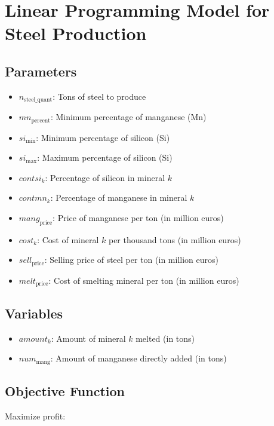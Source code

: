 \documentclass{article}
\begin{document}
\section*{Linear Programming Model for Steel Production}

\subsection*{Parameters}

\begin{itemize}
    \item $n_{\text{steel\_quant}}$: Tons of steel to produce
    \item $mn_{\text{percent}}$: Minimum percentage of manganese (Mn)
    \item $si_{\text{min}}$: Minimum percentage of silicon (Si)
    \item $si_{\text{max}}$: Maximum percentage of silicon (Si)
    \item $contsi_k$: Percentage of silicon in mineral $k$
    \item $contmn_k$: Percentage of manganese in mineral $k$
    \item $mang_{\text{price}}$: Price of manganese per ton (in million euros)
    \item $cost_k$: Cost of mineral $k$ per thousand tons (in million euros)
    \item $sell_{\text{price}}$: Selling price of steel per ton (in million euros)
    \item $melt_{\text{price}}$: Cost of smelting mineral per ton (in million euros)
\end{itemize}

\subsection*{Variables}

\begin{itemize}
    \item $amount_k$: Amount of mineral $k$ melted (in tons)
    \item $num_{\text{mang}}$: Amount of manganese directly added (in tons)
\end{itemize}

\subsection*{Objective Function}

Maximize profit:
\end{document}
